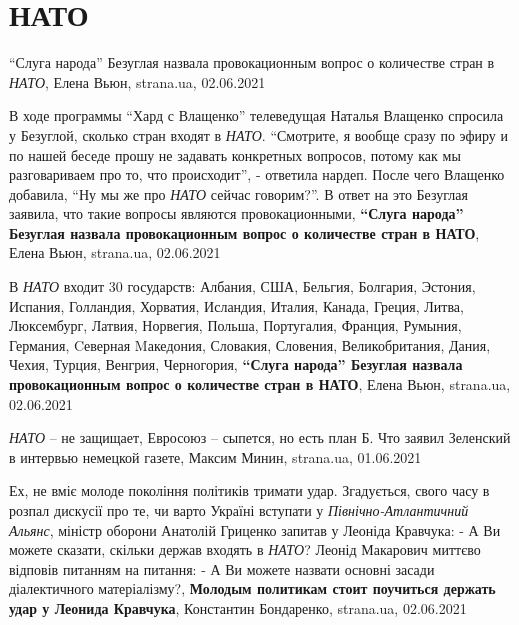  
 
 
 
 
\chapter{НАТО}

\enquote{Слуга народа} Безуглая назвала провокационным вопрос о количестве стран в \emph{НАТО},
Елена Вьюн, strana.ua, 02.06.2021

В ходе программы \enquote{Хард с Влащенко} телеведущая Наталья Влащенко
спросила у Безуглой, сколько стран входят в \emph{НАТО}.  \enquote{Смотрите, я вообще
сразу по эфиру и по нашей беседе прошу не задавать конкретных вопросов, потому
как мы разговариваем про то, что происходит}, - ответила нардеп.  После чего
Влащенко добавила, \enquote{Ну мы же про \emph{НАТО} сейчас говорим?}.  В ответ на это
Безуглая заявила, что такие вопросы являются провокационными,
\textbf{\enquote{Слуга народа} Безуглая назвала провокационным вопрос о количестве стран в НАТО},
Елена Вьюн, strana.ua, 02.06.2021

В \emph{НАТО} входит 30 государств: Албания, США, Бельгия, Болгария, Эстония, Испания,
Голландия, Хорватия, Исландия, Италия, Канада, Греция, Литва, Люксембург,
Латвия, Норвегия, Польша, Португалия, Франция, Румыния, Германия, Cеверная
Mакедония, Словакия, Словения, Великобритания, Дания, Чехия, Турция, Венгрия,
Черногория,
\textbf{\enquote{Слуга народа} Безуглая назвала провокационным вопрос о количестве стран в НАТО},
Елена Вьюн, strana.ua, 02.06.2021

\emph{НАТО} – не защищает, Евросоюз – сыпется, но есть план Б. Что заявил Зеленский в интервью немецкой газете,
Максим Минин, strana.ua, 01.06.2021

Ех, не вміє молоде покоління політиків тримати удар. Згадується, свого часу в
розпал дискусії про те, чи варто Україні вступати у \emph{Північно-Атлантичний
Альянс}, міністр оборони Анатолій Гриценко запитав у Леоніда Кравчука: - А Ви
можете сказати, скільки держав входять в \emph{НАТО}?  Леонід Макарович миттєво
відповів питанням на питання: - А Ви можете назвати основні засади
діалектичного матеріалізму?,
\textbf{Молодым политикам стоит поучиться держать удар у Леонида Кравчука}, Константин Бондаренко, strana.ua, 02.06.2021

